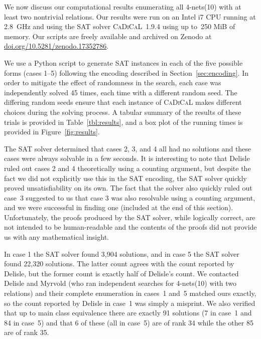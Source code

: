\documentclass[runningheads]{llncs}
\begin{document}
We now discuss our computational results enumerating all 4-nets(10) with at least two
nontrivial relations.  Our results were run on an Intel i7 CPU running at 2.8~GHz
and using the SAT solver \textsc{CaDiCaL}~1.9.4 using up to~250 MiB of memory.
Our scripts are freely available and archived on Zenodo at \href{https://doi.org/10.5281/zenodo.17352786}{doi.org/10.5281/zenodo.17352786}.

We use a Python script to generate SAT instances in each of the five possible forms (cases 1--5)
following the encoding described in Section~\ref{sec:encoding}.  In order to mitigate the effect
of randomness in the search, each case was independently solved 45 times, each time with a different
random seed.  The differing random seeds ensure that each instance of \textsc{CaDiCaL} makes
different choices during the solving process.  A tabular summary of the results of these trials is
provided in Table~\ref{tbl:results}, and a box plot of the running times is provided in
Figure~\ref{fig:results}.

The SAT solver determined that cases 2, 3, and 4 all had no solutions and these cases were always solvable
in a few seconds.  It is interesting to note that Delisle~\cite{delisle2010search} ruled out cases
2 and 4 theoretically using a counting argument, but despite the fact we did not explicitly use this
in the SAT encoding, the SAT solver quickly proved unsatisfiability on its own.
The fact that the solver also quickly ruled out case~3 suggested
to us that case 3
was also resolvable using a counting argument, and we were successful in finding one (included
at the end of this section).
Unfortunately, the proofs produced by the SAT solver,
while logically correct, are not intended to be human-readable and the contents of the proofs did
not provide us with any mathematical insight.

In case 1 the SAT solver found 3,904 solutions, and in case 5 the SAT solver found 22,320 solutions.
The latter count agrees with the count reported by Delisle, but the former count is
exactly half of Delisle's count.  We contacted Delisle and Myrvold (who ran independent searches for
4-nets(10) with two relations) and their complete enumeration
in cases~1 and~5 matched ours exactly, so the count reported by Delisle in case~1
was simply a misprint.  We also verified that up to main class equivalence there are exactly 91 solutions
(7 in case~1 and 84 in case~5) and that 6 of these (all in case~5) are of rank 34
while the other 85 are of rank 35.
\end{document}
